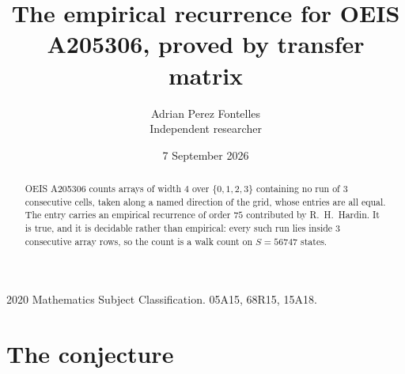 \documentclass[11pt,a4paper]{article}
\title{The empirical recurrence for OEIS A205306, proved by transfer matrix}
\author{Adrian Perez Fontelles\\ \small Independent researcher}
\date{7 September 2026}
\theoremstyle{plain}
\theoremstyle{definition}
\begin{document}
\maketitle

\begin{abstract}
OEIS A205306 counts arrays of width $4$ over $\{0,1,2,3\}$ containing no run of $3$ consecutive
cells, taken along a named direction of the grid, whose entries are all equal. The entry carries
an empirical recurrence of order $75$ contributed by R.~H.~Hardin. It is true, and it is
decidable rather than empirical: every such run lies inside $3$ consecutive array rows, so
the count is a walk count on $S=56747$ states.
\end{abstract}

\noindent\small 2020 Mathematics Subject Classification. 05A15, 68R15, 15A18.\normalsize

\section{The conjecture}
\end{document}
